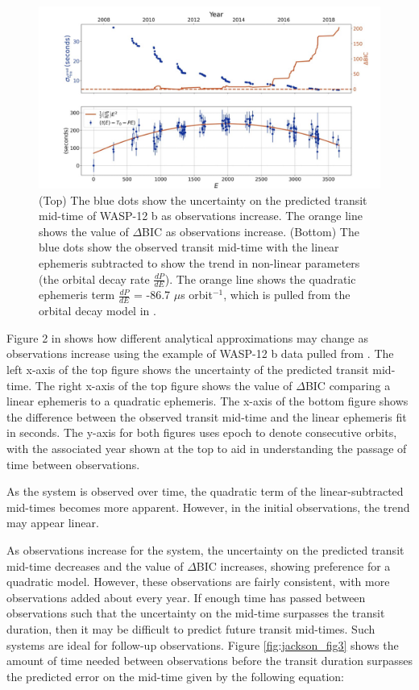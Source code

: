 \documentclass[oneside,12pt]{amsart}
\numberwithin{page}{section}
\begin{document}
\begin{figure}[htbp]
    \centering
    \includegraphics[width=\linewidth]{figs/jackson_fig2.png}
    \caption{(Top) The blue dots show the uncertainty on the predicted transit mid-time of WASP-12 b as observations increase. The orange line shows the value of $\Delta$BIC as observations increase. (Bottom) The blue dots show the observed transit mid-time with the linear ephemeris subtracted to show the trend in non-linear parameters (the orbital decay rate $\frac{dP}{dE}$). The orange line shows the quadratic ephemeris term $\frac{dP}{dE}$ = -86.7 $\mu$s orbit$^{-1}$, which is pulled from the orbital decay model in \citet{yee2019orbit}.}
    \label{fig:jackson_fig2}
\end{figure}

Figure 2 in \citet{jackson2023metrics} shows how different analytical approximations may change as observations increase using the example of WASP-12 b data pulled from \citet{yee2019orbit}. The left x-axis of the top figure shows the uncertainty of the predicted transit mid-time. The right x-axis of the top figure shows the value of $\Delta$BIC comparing a linear ephemeris to a quadratic ephemeris. The x-axis of the bottom figure shows the difference between the observed transit mid-time and the linear ephemeris fit in seconds. The y-axis for both figures uses epoch to denote consecutive orbits, with the associated year shown at the top to aid in understanding the passage of time between observations. 

As the system is observed over time, the quadratic term of the linear-subtracted mid-times becomes more apparent. However, in the initial observations, the trend may appear linear. 

As observations increase for the system, the uncertainty on the predicted transit mid-time decreases and the value of $\Delta$BIC increases, showing preference for a quadratic model. However, these observations are fairly consistent, with more observations added about every year. If enough time has passed between observations such that the uncertainty on the mid-time surpasses the transit duration, then it may be difficult to predict future transit mid-times. Such systems are ideal for follow-up observations. Figure \ref{fig:jackson_fig3} shows the amount of time needed between observations before the transit duration surpasses the predicted error on the mid-time given by the following equation:
\end{document}
